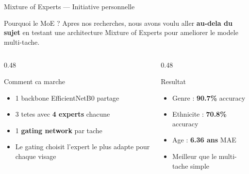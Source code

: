 \documentclass[aspectratio=169, 12pt]{beamer}
\begin{document}
\begin{frame}{Mixture of Experts --- Initiative personnelle}

\begin{exampleblock}{Pourquoi le MoE ?}
{\small Apres nos recherches, nous avons voulu aller \textbf{au-dela du sujet} en testant une architecture Mixture of Experts pour ameliorer le modele multi-tache.}
\end{exampleblock}

\vspace{0.2cm}

\begin{columns}[T]
\begin{column}{0.48\textwidth}
\begin{block}{Comment ca marche}
\begin{itemize}
    \item {\small 1 backbone EfficientNetB0 partage}
    \item {\small 3 tetes avec \textbf{4 experts} chacune}
    \item {\small 1 \textbf{gating network} par tache}
    \item {\small Le gating choisit l'expert le plus adapte pour chaque visage}
\end{itemize}
\end{block}
\end{column}
\begin{column}{0.48\textwidth}
\begin{block}{Resultat}
\begin{itemize}
    \item {\small Genre : \textbf{90.7\%} accuracy}
    \item {\small Ethnicite : \textbf{70.8\%} accuracy}
    \item {\small Age : \textbf{6.36 ans} MAE}
    \item {\small Meilleur que le multi-tache simple}
\end{itemize}
\end{block}
\end{column}
\end{columns}
\end{frame}
\end{document}

